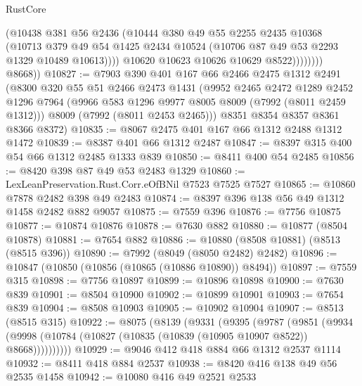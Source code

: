 \begin{lexlean}{RustCore}
\begin{coremodule}
                        (@10438
                          @381
                          @56
                          @2436
                          (@10444
                            @380
                            @49
                            @55
                            @2255
                            @2435
                            @10368
                            (@10713
                              @379
                              @49
                              @54
                              @1425
                              @2434
                              @10524
                              (@10706 @87 @49 @53 @2293 @1329 @10489 @10613))))
                        @10620
                        @10623
                        @10626
                        @10629
                        @8522))))))))
        @8668))
@10827 := @7903
    @390
    @401
    @167
    @66
    @2466
    @2475
    @1312
    @2491
    (@8300
      @320
      @55
      @51
      @2466
      @2473
      @1431
      (@9952
        @2465
        @2472
        @1289
        @2452
        @1296
        @7964
        (@9966 @583 @1296 @9977 @8005 @8009 (@7992 (@8011 @2459 @1312)))
        @8009
        (@7992 (@8011 @2453 @2465)))
      @8351
      @8354
      @8357
      @8361
      @8366
      @8372)
@10835 := @8067 @2475 @401 @167 @66 @1312 @2488 @1312 @1472
@10839 := @8387 @401 @66 @1312 @2487
@10847 := @8397 @315 @400 @54 @66 @1312 @2485 @1333 @839
@10850 := @8411 @400 @54 @2485
@10856 := @8420 @398 @87 @49 @53 @2483 @1329
@10860 := LexLeanPreservation.Rust.Corr.eOfBNil @7523 @7525 @7527
@10865 := @10860 @7878 @2482 @398 @49 @2483
@10874 := @8397 @396 @138 @56 @49 @1312 @1458 @2482 @882 @9057
@10875 := @7559 @396
@10876 := @7756 @10875
@10877 := @10874 @10876
@10878 := @7630 @882
@10880 := @10877 (@8504 @10878)
@10881 := @7654 @882
@10886 := @10880 (@8508 @10881) (@8513 (@8515 @396))
@10890 := @7992 (@8049 (@8050 @2482) @2482)
@10896 := @10847 (@10850 (@10856 (@10865 (@10886 @10890)) @8494))
@10897 := @7559 @315
@10898 := @7756 @10897
@10899 := @10896 @10898
@10900 := @7630 @839
@10901 := @8504 @10900
@10902 := @10899 @10901
@10903 := @7654 @839
@10904 := @8508 @10903
@10905 := @10902 @10904
@10907 := @8513 (@8515 @315)
@10922 := @8075
    (@8139
      (@9331
        (@9395
          (@9787
            (@9851
              (@9934 (@9998 (@10784 (@10827 (@10835 (@10839 (@10905 @10907 @8522)) @8668))))))))))
@10929 := @9046 @412 @418 @884 @66 @1312 @2537 @1114
@10932 := @8411 @418 @884 @2537
@10938 := @8420 @416 @138 @49 @56 @2535 @1458
@10942 := @10080 @416 @49 @2521 @2533

\end{coremodule}
\end{lexlean}

